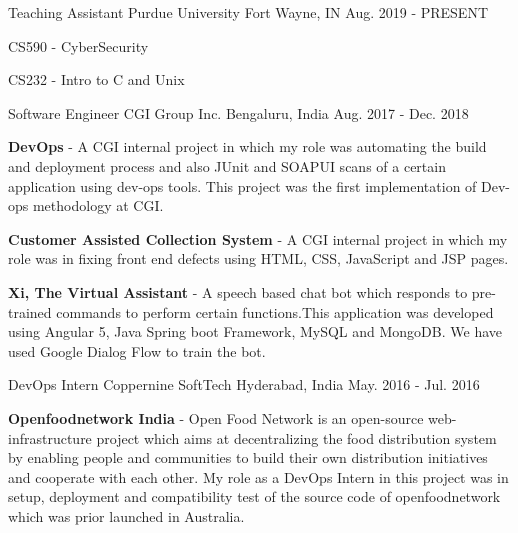 
\begin{cventries}
  \cventry
    {Teaching Assistant} %
    {Purdue University} %
    {Fort Wayne, IN} %
    {Aug. 2019 - PRESENT} %
    {
      \begin{cvitems} %
        \item {CS590 - CyberSecurity}
		\item {CS232 - Intro to C and Unix}
      \end{cvitems}
    }

  \cventry
    {Software Engineer} %
    {CGI Group Inc.} %
    {Bengaluru, India} %
    {Aug. 2017 - Dec. 2018} %
    {
      \begin{cvitems} %
        \item { \textbf{DevOps} - A CGI internal project in which my role was automating the build and deployment process and also JUnit and SOAPUI scans of a certain application using dev-ops tools. This project was the first implementation of Dev-ops methodology at CGI.}
        \item { \textbf{Customer Assisted Collection System} - A CGI internal project in which my role was in fixing front end defects using HTML, CSS, JavaScript and JSP pages.}
        \item { \textbf{Xi, The Virtual Assistant} - A speech based chat bot which responds to pre-trained commands to perform certain functions.This application was developed using Angular 5, Java Spring boot Framework, MySQL and MongoDB. We have used Google Dialog Flow to train the bot.}
      \end{cvitems}
    }

  \cventry
    {DevOps Intern} %
    {Coppernine SoftTech} %
    {Hyderabad, India} %
    {May. 2016 - Jul. 2016} %
    {
      \begin{cvitems} %
        \item { \textbf{Openfoodnetwork India} - Open Food Network is an open-source web-infrastructure project which aims at decentralizing the food distribution system by enabling people and communities to build their own distribution initiatives and cooperate with each other. My role as a DevOps Intern in this project was in setup, deployment and compatibility test of the source code of openfoodnetwork which was prior launched in Australia.}
      \end{cvitems}
    }
\end{cventries}
